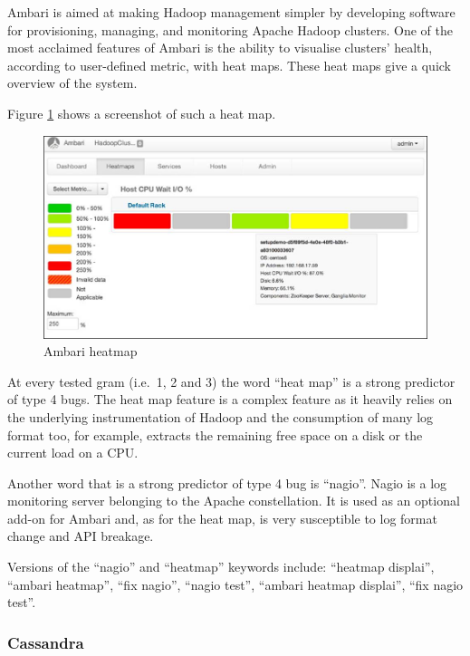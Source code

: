 \documentclass[12pt]{report}
\begin{document}
Ambari is aimed at making Hadoop management simpler by developing
software for provisioning, managing, and monitoring Apache Hadoop
clusters. One of the most acclaimed features of Ambari is the ability to
visualise clusters' health, according to user-defined metric, with heat
maps. These heat maps give a quick overview of the system.

Figure \ref{fig:ambari-heatmap} shows a screenshot of such a heat map.

\begin{figure}[h!]
  \centering
    \includegraphics[scale=0.6]{media/chap9/ambari-heatmap.jpg}
    \caption{Ambari heatmap
    \label{fig:ambari-heatmap}}
\end{figure}

At every tested gram (i.e.~1, 2 and 3) the word ``heat map'' is a strong
predictor of type 4 bugs. The heat map feature is a complex feature as
it heavily relies on the underlying instrumentation of Hadoop and the
consumption of many log format too, for example, extracts the remaining
free space on a disk or the current load on a CPU.

Another word that is a strong predictor of type 4 bug is ``nagio''.
Nagio is a log monitoring server belonging to the Apache constellation.
It is used as an optional add-on for Ambari and, as for the heat map, is
very susceptible to log format change and API breakage.

Versions of the ``nagio'' and ``heatmap'' keywords include: ``heatmap
displai'', ``ambari heatmap'', ``fix nagio'', ``nagio test'', ``ambari
heatmap displai'', ``fix nagio test''.

\subsubsection{Cassandra}\label{cassandra}
\end{document}

